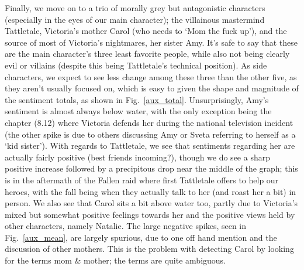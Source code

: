 \documentclass[11pt]{article}
\begin{document}
\noindent
Finally, we move on to a trio of morally grey but antagonistic characters (especially in the eyes of our main character); the villainous mastermind Tattletale, Victoria's mother Carol (who needs to `Mom the fuck up'), and the source of most of Victoria's nightmares, her sister Amy. It's safe to say that these are the main character's three least favorite people, while also not being clearly evil or villains (despite this being Tattletale's technical position).  As side characters, we expect to see less change among these three than the other five, as they aren't usually focused on, which is easy to given the shape and magnitude of the sentiment totals, as shown in Fig.~\ref{aux_total}. Unsurprisingly, Amy's sentiment is almost always below water, with the only exception being the chapter (8.12) where Victoria defends her during the national television incident (the other spike is due to others discussing Amy or Sveta referring to herself as a `kid sister'). With regards to Tattletale, we see that sentiments regarding her are actually fairly positive (best friends incoming?), though we do see a sharp positive increase followed by a precipitous drop near the middle of the graph; this is in the aftermath of the Fallen raid where first Tattletale offers to help our heroes, with the fall being when they actually talk to her (and roast her a bit) in person. We also see that Carol sits a bit above water too, partly due to Victoria's mixed but somewhat positive feelings towards her and the positive views held by other characters, namely Natalie. The large negative spikes, seen in Fig.~\ref{aux_mean}, are largely spurious, due to one off hand mention and the discussion of other mothers. This is the problem with detecting Carol by looking for the terms mom \& mother; the terms are quite ambiguous. 
\end{document}
